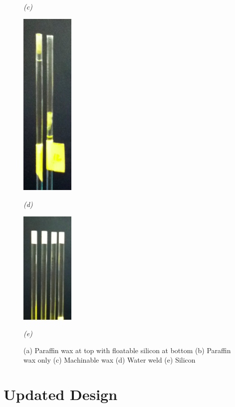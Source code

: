 \begin{figure}[htb]
\begin{minipage}[b]{1in}
    \centerline{\emph{(c)}}
  \end{minipage}
  \begin{minipage}[b]{1in}
    \centering
    \centerline{\mbox{\includegraphics[width=1in]{phantom/images/tube_sealings/water_weld.eps}}}
    \centerline{\emph{(d)}}
  \end{minipage}
  \begin{minipage}[b]{1in}
    \centering
    \centerline{\mbox{\includegraphics[width=1in]{phantom/images/tube_sealings/silicon.eps}}}
    \centerline{\emph{(e)}}
  \end{minipage}
  \caption{(a) Paraffin wax at top with floatable silicon at bottom (b) Paraffin wax only (c) Machinable wax (d) Water weld (e) Silicon}
\end{figure}

\section{Updated Design}


